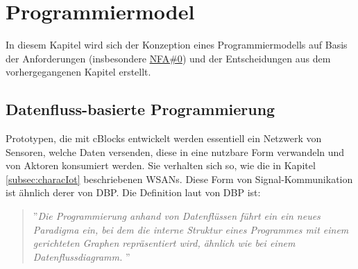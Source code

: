 \section{Programmiermodel}
In diesem Kapitel wird sich der Konzeption eines Programmiermodells auf Basis der Anforderungen (insbesondere \hyperref[tab:NFA0]{NFA\#0}) und der Entscheidungen aus dem vorhergegangenen Kapitel erstellt.

\subsection{Datenfluss-basierte Programmierung}\label{subsection:datenflussprog}
Prototypen, die mit cBlocks entwickelt werden essentiell ein Netzwerk von Sensoren, welche Daten versenden, diese in eine nutzbare Form verwandeln und von Aktoren konsumiert werden. Sie verhalten sich so, wie die in Kapitel \ref{subsec:characIot} beschriebenen \acp{WSAN}. Diese Form von Signal-Kommunikation ist ähnlich derer von \ac{DBP}. Die Definition  laut \cite{sousa2012dataflow} von \ac{DBP} ist:
\begin{quote}
    ''\textit{Die Programmierung anhand von Datenflüssen führt ein ein neues Paradigma ein, bei dem die interne Struktur eines Programmes mit einem gerichteten Graphen repräsentiert wird, ähnlich wie bei einem Datenflussdiagramm.} ''
\end{quote}

